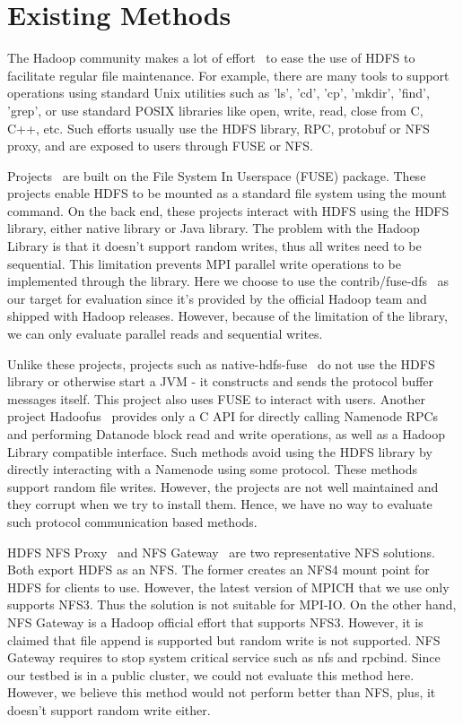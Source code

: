\section{Existing Methods}
\label{sec:bg}
The Hadoop community makes a lot of effort~\cite{fuse} to ease the use of HDFS to
facilitate regular file maintenance. For example, there are many tools to support
operations using standard Unix
utilities such as 'ls', 'cd', 'cp', 'mkdir', 'find', 'grep', or use standard
POSIX libraries like open, write, read, close from C, C++, etc. Such efforts
usually use the HDFS library, RPC, protobuf or NFS proxy, and are exposed to users
through FUSE or NFS.

Projects~\cite{fuse, hdfs-fuse, fuse-j} are built on the File System In Userspace (FUSE) package. These projects enable
HDFS to be mounted as a standard file system using the mount command. On the
back end, these projects interact with HDFS using the HDFS library, either native
library or Java library. The problem with the Hadoop Library is that it doesn't
support random writes, thus all writes need to be sequential. This limitation
prevents MPI parallel write operations to be implemented through the library.
Here we choose
to use the contrib/fuse-dfs~\cite{fuse} as our target for evaluation since it's
provided by the official Hadoop team and shipped with Hadoop releases. However,
because of the limitation of the library, we can only evaluate parallel reads and
sequential writes.

Unlike
these projects, projects such as native-hdfs-fuse~\cite{native} do not use the
HDFS library or otherwise start a JVM - it constructs and sends the protocol buffer
messages itself. This project also uses FUSE to interact with users. Another
project Hadoofus~\cite{hadoofus} provides only a C
API for directly calling Namenode RPCs and performing Datanode block read and
write operations, as well as a Hadoop Library compatible interface. Such methods
avoid using the HDFS library by directly interacting with a Namenode using some
protocol. These methods support random file writes. However, the projects are
not well maintained and they corrupt when we try to install them. Hence, we have
no way to evaluate such protocol communication based methods.

HDFS NFS Proxy~\cite{proxy} and NFS Gateway~\cite{nfs} are two representative
NFS solutions. Both export HDFS as an NFS. The former creates an NFS4 mount point
for HDFS for clients to use. However, the latest version of MPICH that
we use only supports NFS3. Thus the solution is not suitable for MPI-IO. On the
other hand, NFS Gateway is a Hadoop official effort that supports NFS3. However,
it is claimed that file append is supported but random write is not supported.
NFS Gateway requires to stop system
critical service such as nfs and rpcbind. Since our testbed is in a public
cluster, we could not evaluate this method here. However, we believe this method would
not perform better than NFS, plus, it doesn't support random write either.
